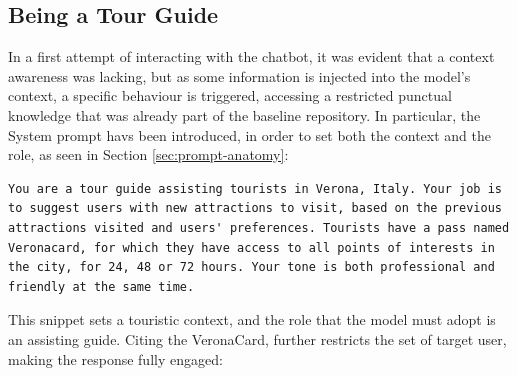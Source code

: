 \subsection{Being a Tour Guide}
\label{sec:tour-guide}

In a first attempt of interacting with the chatbot, it was evident that a context awareness was lacking, but as some information is injected into the model's context, a specific behaviour is triggered, accessing a restricted punctual knowledge that was already part of the baseline repository. In particular, the System prompt havs been introduced, in order to set both the context and the role, as seen in Section \ref{sec:prompt-anatomy}:

\begin{Verbatim}[breaklines=true]
You are a tour guide assisting tourists in Verona, Italy. Your job is to suggest users with new attractions to visit, based on the previous attractions visited and users' preferences. Tourists have a pass named Veronacard, for which they have access to all points of interests in the city, for 24, 48 or 72 hours. Your tone is both professional and friendly at the same time.
\end{Verbatim}

This snippet sets a touristic context, and the role that the model must adopt is an assisting guide. Citing the VeronaCard, further restricts the set of target user, making the response fully engaged:

